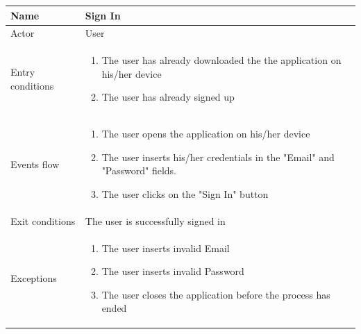 \documentclass{article}
\begin{document}
\begin{table}[H]
    \begin{tabular}{|l|l|}
    \hline
    Name &\begin{minipage}[t]{0.7\textwidth} \textbf{Sign In} \end{minipage} \\ \hline  
    Actor & \begin{minipage}[t]{0.7\textwidth} User \end{minipage} \\ \hline 
    Entry conditions & \begin{minipage}[t]{0.7\textwidth} \begin{enumerate}
        \item The user has already downloaded the the application on his/her
        device
        \item The user has already signed up
    \end{enumerate}
    \end{minipage} \\ \hline 
    Events flow & \begin{minipage}[t]{0.7\textwidth}
    \begin{enumerate}
        \item The user opens the application on his/her device
        \item The user inserts his/her credentials in the "Email" and "Password"
        fields.
        \item The user clicks on the "Sign In" button
    \end{enumerate}
    \end{minipage} \\ \hline
    Exit conditions & \begin{minipage}[t]{0.7\textwidth} The user is
    successfully signed in \end{minipage} \\ \hline
    Exceptions & \begin{minipage}[t]{0.7\textwidth}
    \begin{enumerate}
        \item The user inserts invalid Email
        \item The user inserts invalid Password   
        \item The user closes the application before the process has ended 
    \end{enumerate}
    \end{minipage} \\ \hline
    \end{tabular}
\end{table}
\end{document}
